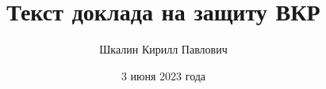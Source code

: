 

\author{Шкалин Кирилл Павлович}
\title{Текст доклада на защиту ВКР}
\date{3 июня 2023 года}


  \maketitle
  
  \newpage
  
  \newpage
  
  \newpage
  
  \newpage
  
  \newpage
  
  \newpage
  
  \newpage
  
  \newpage
  


